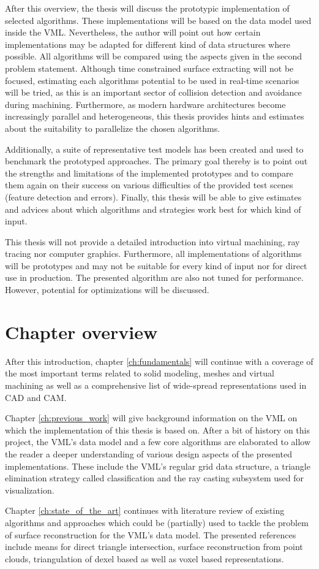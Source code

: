 After this overview, the thesis will discuss the prototypic implementation of selected algorithms.
These implementations will be based on the data model used inside the VML.
Nevertheless, the author will point out how certain implementations may be adapted for different kind of data structures where possible.
All algorithms will be compared using the aspects given in the second problem statement.
Although time constrained surface extracting will not be focused, estimating each algorithms potential to be used in real-time scenarios will be tried, as this is an important sector of collision detection and avoidance during machining.
Furthermore, as modern hardware architectures become increasingly parallel and heterogeneous, this thesis provides hints and estimates about the suitability to parallelize the chosen algorithms.

Additionally, a suite of representative test models has been created and used to benchmark the prototyped approaches.
The primary goal thereby is to point out the strengths and limitations of the implemented prototypes and to compare them again on their success on various difficulties of the provided test scenes (\eg feature detection and errors).
Finally, this thesis will be able to give estimates and advices about which algorithms and strategies work best for which kind of input.

This thesis will not provide a detailed introduction into virtual machining, ray tracing nor computer graphics.
Furthermore, all implementations of algorithms will be prototypes and may not be suitable for every kind of input nor for direct use in production.
The presented algorithm are also not tuned for performance.
However, potential for optimizations will be discussed.


\section{Chapter overview}
\label{sec:chapter_overview}

After this introduction, chapter \ref{ch:fundamentals} will continue with a coverage of the most important terms related to solid modeling, meshes and virtual machining as well as a comprehensive list of wide-spread representations used in CAD and CAM.

Chapter \ref{ch:previous_work} will give background information on the VML on which the implementation of this thesis is based on.
After a bit of history on this project, the VML's data model and a few core algorithms are elaborated to allow the reader a deeper understanding of various design aspects of the presented implementations. These include the VML's regular grid data structure, a triangle elimination strategy called classification and the ray casting subsystem used for visualization.

Chapter \ref{ch:state_of_the_art} continues with literature review of existing algorithms and approaches which could be (partially) used to tackle the problem of surface reconstruction for the VML's data model.
The presented references include means for direct triangle intersection, surface reconstruction from point clouds, triangulation of dexel based as well as voxel based representations.

